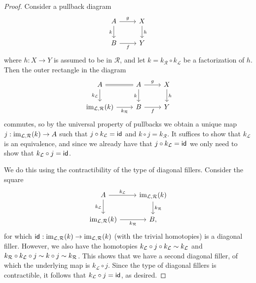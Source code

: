 \begin{proof}
Consider a pullback diagram
\begin{equation*}
\begin{tikzcd}
A \arrow[d,swap,"k"] \arrow[r,"g"] & X \arrow[d,"h"] \\
B \arrow[r,swap,"f"] & Y
\end{tikzcd}
\end{equation*}
where $h:X\to Y$ is assumed to be in $\mathcal{R}$, and let $k=k_{\mathcal{R}}\circ k_\mathcal{L}$ be a factorization of $h$.
Then the outer rectangle in the diagram
\begin{equation*}
\begin{tikzcd}
A \arrow[r,equals] \arrow[d,swap,"k_{\mathcal{L}}"] & A \arrow[d,swap,"k"] \arrow[r,"g"] & X \arrow[d,"h"] \\
\im_{\mathcal{L},\mathcal{R}}(k) \arrow[r,swap,"k_{\mathcal{R}}"] & B \arrow[r,swap,"f"] & Y
\end{tikzcd}
\end{equation*}
commutes, so by the universal property of pullbacks we obtain a unique map $j:\operatorname{im}_{\mathcal{L},\mathcal{R}}(k)\to A$ such that $j\circ k_{\mathcal{L}}=\mathsf{id}_{}$ and $k\circ j=k_{\mathcal{R}}$.
It suffices to show that $k_{\mathcal{L}}$ is an equivalence, and since we already have that $j\circ k_{\mathcal{L}}=\mathsf{id}_{}$ we only need to show that $k_{\mathcal{L}}\circ j=\mathsf{id}_{}$.

We do this using the contractibility of the type of diagonal fillers. Consider the square
\begin{equation*}
\begin{tikzcd}
A \arrow[r,"k_{\mathcal{L}}"] \arrow[d,swap,"k_{\mathcal{L}}"] & \im_{\mathcal{L},\mathcal{R}}(k) \arrow[d,"k_{\mathcal{R}}"] \\
\im_{\mathcal{L},\mathcal{R}}(k) \arrow[r,swap,"k_{\mathcal{R}}"] & B,
\end{tikzcd}
\end{equation*}
for which $\mathsf{id}_{}:\operatorname{im}_{\mathcal{L},\mathcal{R}}(k)\to \operatorname{im}_{\mathcal{L},\mathcal{R}}(k)$ (with the trivial homotopies) is a diagonal filler. However, we also have the homotopies $k_{\mathcal{L}}\circ j\circ k_{\mathcal{L}} \sim k_{\mathcal{L}}$ and $k_{\mathcal{R}}\circ k_{\mathcal{L}}\circ j\sim k\circ j\sim k_{\mathcal{R}}$. This shows that we have a second diagonal filler, of which the underlying map is $k_{\mathcal{L}}\circ j$. Since the type of diagonal fillers is contractible, it follows that $k_{\mathcal{L}}\circ j=\mathsf{id}_{}$, as desired.
\end{proof}

